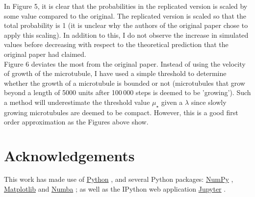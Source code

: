 \documentclass[11pt]{article}
\begin{document}
In Figure 5, it is clear that the probabilities in the replicated version is scaled by some value compared to the original. The replicated version is scaled so that the total probability is 1 (it is unclear why the authors of the original paper chose to apply this scaling). In addition to this, I do not observe the increase in simulated values before decreasing with respect to the theoretical prediction that the original paper had claimed.\\

Figure 6 deviates the most from the original paper. Instead of using the velocity of growth of the microtubule, I have used a simple threshold to determine whether the growth of a microtubule is bounded or not (microtubules that grow beyond a length of 5000 units after 100\,000 steps is deemed to be 'growing'). Such a method will underestimate the threshold value $\mu_\star$ given a $\lambda$ since slowly growing microtubules are deemed to be compact. However, this is a good first order approximation as the Figures above show.

\section{Acknowledgements}
This work has made use of \href{https://www.python.org}{Python} \citep{python}, and several Python packages: \href{https://www.numpy.org}{NumPy} \citep{harris2020array}, \href{https://www.matplotlib.org}{Matplotlib} \citep{hunter2007matplotlib} and \href{https://numba.pydata.org/}{Numba} \citep{lam2015numba}; as well as the IPython web application \href{https://jupyter.org/}{Jupyter} \citep{ipython}.


\end{document}
